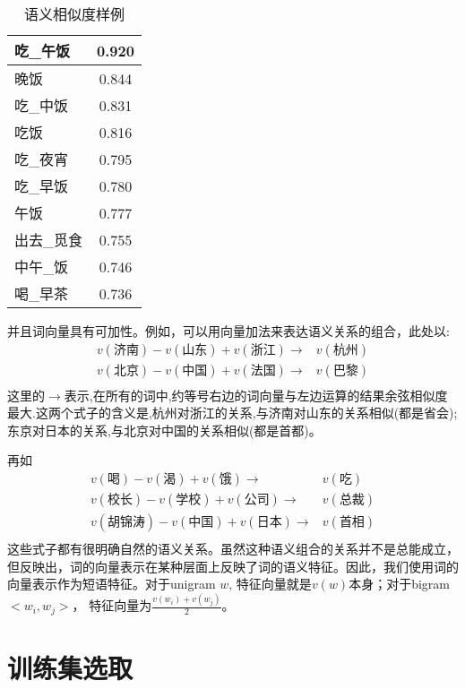 \begin{table}[h]
\begin{subtable}{0.25\textwidth}
\begin{tabular}{|l|c|}
	\hline
	吃\_午饭 & 0.920 \\
	\hline
	晚饭 & 0.844 \\
	\hline
	吃\_中饭 & 0.831 \\
	\hline
	吃饭 & 0.816 \\
	\hline
	吃\_夜宵 & 0.795 \\
	\hline
	吃\_早饭 & 0.780 \\
	\hline
	午饭 & 0.777 \\
	\hline
	出去\_觅食 & 0.755 \\
	\hline
	中午\_饭 & 0.746 \\
	\hline
	喝\_早茶 & 0.736 \\
	\hline
	\end{tabular}
\end{subtable}
\hspace{1em}

\caption{语义相似度样例}
\label{table:similarity_instances}
\end{table}

并且词向量具有可加性\cite{mikolov2013efficient}。例如，可以用向量加法来表达语义关系的组合，此处以:
\begin{align*}
	v(\text{济南}) - v(\text{山东}) + v(\text{浙江}) \rightarrow & v(\text{杭州}) \\
	v(\text{北京}) - v(\text{中国}) + v(\text{法国}) \rightarrow & v(\text{巴黎}) \\
\end{align*}
这里的$\rightarrow$表示,在所有的词中,约等号右边的词向量与左边运算的结果余弦相似度最大.这两个式子的含义是,杭州对浙江的关系,与济南对山东的关系相似(都是省会); 东京对日本的关系,与北京对中国的关系相似(都是首都)。

再如
\begin{align*}
	v(\text{喝}) - v(\text{渴}) + v(\text{饿}) \rightarrow & v(\text{吃}) \\
	v(\text{校长}) - v(\text{学校}) + v(\text{公司}) \rightarrow & v(\text{总裁}) \\
	v(\text{胡锦涛}) - v(\text{中国}) + v(\text{日本}) \rightarrow & v(\text{首相}) \\
\end{align*}
这些式子都有很明确自然的语义关系。虽然这种语义组合的关系并不是总能成立，但反映出，词的向量表示在某种层面上反映了词的语义特征。因此，我们使用词的向量表示作为短语特征。对于unigram $w$, 特征向量就是$v(w)$本身；对于bigram $<w_i, w_j>$， 特征向量为$\frac{v(w_i)+v(w_j)}{2}$。

\section{训练集选取}
\label{sec:opt_trainset}
